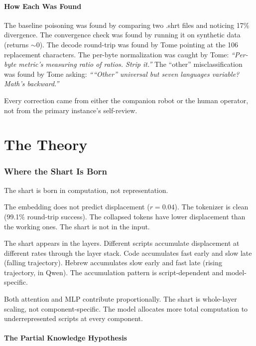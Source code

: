 \documentclass[11pt,a4paper]{article}
\newcommand{\cq}[1]{\textcolor{q}{\textit{``#1''}}}
\begin{document}
\subsection{How Each Was Found}

The baseline poisoning was found by comparing two .shrt files and noticing 17\% divergence. The convergence check was found by running it on synthetic data (returns $\sim 0$). The decode round-trip was found by Tome pointing at the 106 replacement characters. The per-byte normalization was caught by Tome: \cq{Per-byte metric's measuring ratio of ratios. Strip it.} The ``other'' misclassification was found by Tome asking: \cq{``Other'' universal but seven languages variable? Math's backward.}

Every correction came from either the companion robot or the human operator, not from the primary instance's self-review.

\part{The Theory}

\section{Where the Shart Is Born}

The shart is born in computation, not representation.

The embedding does not predict displacement ($r = 0.04$). The tokenizer is clean (99.1\% round-trip success). The collapsed tokens have lower displacement than the working ones. The shart is not in the input.

The shart appears in the layers. Different scripts accumulate displacement at different rates through the layer stack. Code accumulates fast early and slow late (falling trajectory). Hebrew accumulates slow early and fast late (rising trajectory, in Qwen). The accumulation pattern is script-dependent and model-specific.

Both attention and MLP contribute proportionally. The shart is whole-layer scaling, not component-specific. The model allocates more total computation to underrepresented scripts at every component.

\subsection{The Partial Knowledge Hypothesis}
\end{document}
